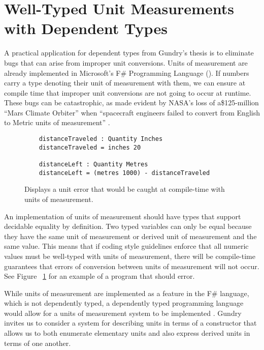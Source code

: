 \section{Well-Typed Unit Measurements with Dependent Types}

A practical application for dependent types from Gundry's thesis is to eliminate
bugs that can arise from improper unit conversions. Units of measurement are
already implemented in Microsoft's F\# Programming Language
(\cite{kennedy2009}). If numbers carry a type denoting their unit of measurement
with them, we can ensure at compile time that improper unit conversions are not
going to occur at runtime. These bugs can be catastrophic, as made evident by
NASA's loss of a\$125-million ``Mars Climate Orbiter'' when ``spacecraft
engineers failed to convert from English to Metric units of measurement''
\cite{hotz1999}. 

\begin{figure}
  \caption{Displays a unit error that would be caught at compile-time with units of measurement.}
  \label{unit_error}
  \begin{lstlisting}
    distanceTraveled : Quantity Inches
    distanceTraveled = inches 20

    distanceLeft : Quantity Metres
    distanceLeft = (metres 1000) - distanceTraveled
  \end{lstlisting}
\end{figure}

An implementation of units of measurement should have types that support
decidable equality by definition. Two typed variables can only be equal because
they have the same unit of measurement or derived unit of measurement and the
same value. This means that if coding style guidelines enforce that all numeric
values must be well-typed with units of measurement, there will be compile-time
guarantees that errors of conversion between units of measurement will not
occur. See Figure ~\ref{unit_error} for an example of a program that should
error. 

While units of measurement are implemented as a feature in the F\# language,
which is not dependently typed, a dependently typed programming language would
allow for a units of measurement system to be implemented \cite{gundry2013}.
Gundry invites us to consider a system for describing units in terms of a
constructor that allows us to both enumerate elementary units and also express
derived units in terms of one another. 

